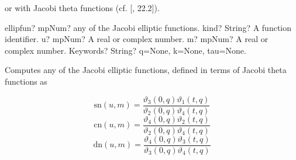 or with Jacobi theta functions (cf. [\cite{NIST}, 22.2]).
%
%
%
%
%
%
%
%
%
%
%

\vpara

\begin{mpFunctionsExtract}
	\mpFunctionFour
	{ellipfun? mpNum? any of the Jacobi elliptic functions.}
	{kind? String? A function identifier.}	
	{u? mpNum? A real or complex number.}
	{m? mpNum? A real or complex number.}
	{Keywords? String?  q=None, k=None, tau=None.}		
\end{mpFunctionsExtract}


\vpara
Computes any of the Jacobi elliptic functions, defined in terms of Jacobi theta functions as

\begin{equation}
\text{sn}(u,m) = \frac{\vartheta_3(0,q)\vartheta_1(t,q)}{\vartheta_2(0,q)\vartheta_4(t,q)}
\end{equation}
\begin{equation}
\text{cn}(u,m) = \frac{\vartheta_4(0,q)\vartheta_2(t,q)}{\vartheta_2(0,q)\vartheta_4(t,q)}
\end{equation}
\begin{equation}
\text{dn}(u,m) = \frac{\vartheta_4(0,q)\vartheta_3(t,q)}{\vartheta_3(0,q)\vartheta_4(t,q)}
\end{equation}

